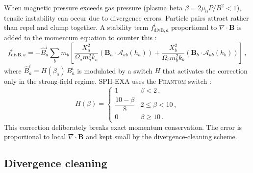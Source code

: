 When magnetic pressure exceeds gas pressure (plasma beta $\beta = 2\mu_0 P / B^2 < 1$), tensile instability can occur due to divergence errors. Particle pairs attract rather than repel and clump together. A stability term $f^i_{\mathrm{divB},a}$ proportional to $\nabla \cdot \mathbf{B}$ is added to the momentum equation to counter this \cite{Borve2001}:
\begin{equation}
    f^i_{\mathrm{divB},a} = -\hat{B}^i_a \sum_b m_b \left[\frac{X_a^2}{\Omega_a m_a^2 k_a}(\mathbf{B}_a \cdot \boldsymbol{\mathcal{A}}_{ab}(h_a)) + \frac{X_b^2}{\Omega_b m_b^2 k_b}(\mathbf{B}_b \cdot \boldsymbol{\mathcal{A}}_{ab}(h_b))\right]\,,
    \label{eq:fdivb}
\end{equation}
where $\hat{B}^i_a = H(\beta_a)\, B^i_a$ is modulated by a switch $H$ that activates the correction only in the strong-field regime. SPH-EXA uses the \textsc{Phantom} switch \cite{Price2018}:
\begin{equation}
    H(\beta) = \begin{cases}
        1 & \beta < 2\,, \\
        \dfrac{10 - \beta}{8} & 2 \leq \beta < 10\,, \\
        0 & \beta \geq 10\,.
    \end{cases}
    \label{eq:beta_switch}
\end{equation}
This correction deliberately breaks exact momentum conservation. The error is proportional to local $\nabla \cdot \mathbf{B}$ and kept small by the divergence-cleaning scheme.


\subsection{Divergence cleaning}
\label{sec:divb_cleaning}

